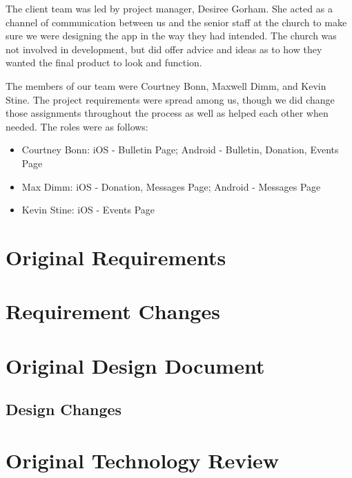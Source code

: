 \documentclass[letterpaper,10pt,draftclsnofoot,onecolumn,titlepage]{IEEEtran}
\begin{document}
The client team was led by project manager, Desiree Gorham.
She acted as a channel of communication between us and the senior staff at the church to make sure we were designing the app in the way they had intended.
The church was not involved in development, but did offer advice and ideas as to how they wanted the final product to look and function.

The members of our team were Courtney Bonn, Maxwell Dimm, and Kevin Stine.
The project requirements were spread among us, though we did change those assignments throughout the process as well as helped each other when needed.
The roles were as follows:

\begin{itemize}
	\item Courtney Bonn: iOS - Bulletin Page; Android - Bulletin, Donation, Events Page
	\item Max Dimm: iOS - Donation, Messages Page; Android - Messages Page
	\item Kevin Stine: iOS - Events Page
\end{itemize}

\section{Original Requirements}

	

\section{Requirement Changes}

\section{Original Design Document}

	

	\subsection{Design Changes}

\section{Original Technology Review}

	
\end{document}
